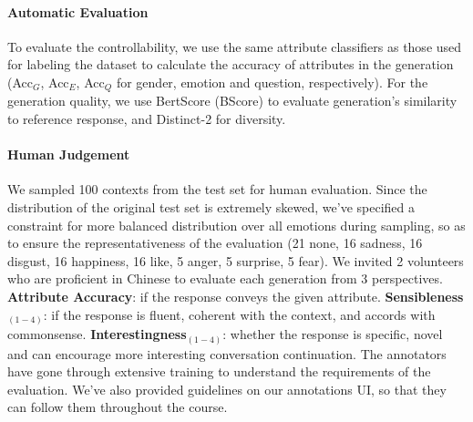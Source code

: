 \paragraph{Automatic Evaluation} To evaluate the controllability, we use the same attribute classifiers as those used for labeling the dataset to calculate the accuracy of attributes in the generation (Acc$_G$, Acc$_E$, Acc$_Q$ for gender, emotion and question, respectively). For the generation quality, we use BertScore (BScore) \cite{zhang2019bertscore} to evaluate generation's similarity to reference response, and Distinct-2 \cite{li2016diversity} for diversity. 

\paragraph{Human Judgement} We sampled 100 contexts from the test set for human evaluation. Since the distribution of the original test set is extremely skewed, we've specified a constraint for more balanced distribution over all emotions during sampling, so as to ensure the representativeness of the evaluation (21 none, 16 sadness, 16 disgust, 16 happiness, 16 like, 5 anger, 5 surprise, 5 fear). We invited 2 volunteers who are proficient in Chinese to evaluate each generation from 3 perspectives. \textbf{Attribute Accuracy}: if the response conveys the given attribute. \textbf{Sensibleness}$_{(1-4)}$: if the response is fluent, coherent with the context, and accords with commonsense. \textbf{Interestingness}$_{(1-4)}$: whether the response is specific, novel and can encourage more interesting conversation continuation. The annotators have gone through extensive training to understand the requirements of the evaluation. We've also provided guidelines on our annotations UI, so that they can follow them throughout the course.

